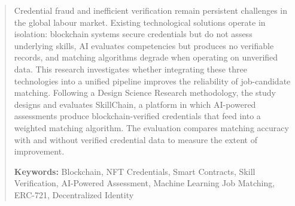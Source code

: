\begin{abstract}
Credential fraud and inefficient verification remain persistent challenges in the global labour market. Existing technological solutions operate in isolation: blockchain systems secure credentials but do not assess underlying skills, AI evaluates competencies but produces no verifiable records, and matching algorithms degrade when operating on unverified data. This research investigates whether integrating these three technologies into a unified pipeline improves the reliability of job-candidate matching. Following a Design Science Research methodology, the study designs and evaluates SkillChain, a platform in which AI-powered assessments produce blockchain-verified credentials that feed into a weighted matching algorithm. The evaluation compares matching accuracy with and without verified credential data to measure the extent of improvement.

\medskip
\noindent\textbf{Keywords:} Blockchain, NFT Credentials, Smart Contracts, Skill Verification, AI-Powered Assessment, Machine Learning Job Matching, ERC-721, Decentralized Identity
\end{abstract}
